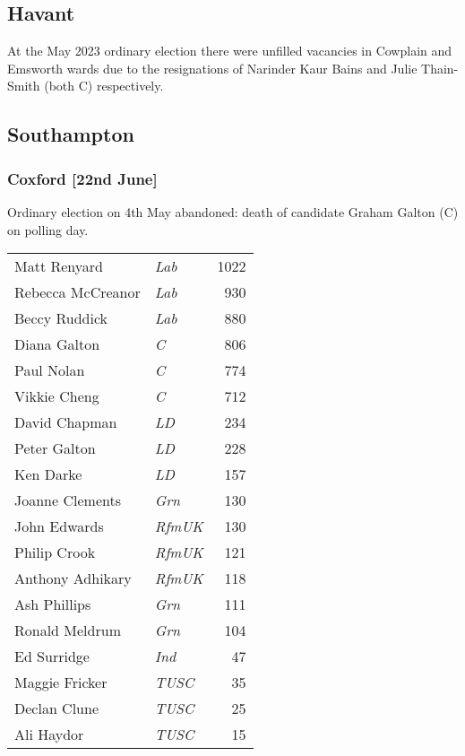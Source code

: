 \documentclass[a4paper,openany]{book}
\begin{document}
\begin{resultsiii}
\subsection*{Havant}

At the May 2023 ordinary election there were unfilled vacancies in Cowplain and Emsworth wards due to the resignations of Narinder Kaur Bains and Julie Thain-Smith (both C) respectively.%
%
%

\subsection*{Southampton}

\subsubsection*{Coxford \hspace*{\fill}\nolinebreak[1]%
	\enspace\hspace*{\fill}
	[22nd June]}


Ordinary election on 4th May abandoned: death of candidate Graham Galton (C) on polling day.

\noindent
\begin{tabular*}{\columnwidth}{@{\extracolsep{\fill}} p{} >{\itshape}l r @{\extracolsep{\fill}}}
	Matt Renyard & Lab & 1022\\
	Rebecca McCreanor & Lab & 930\\
	Beccy Ruddick & Lab & 880\\
	Diana Galton & C & 806\\
	Paul Nolan & C & 774\\
	Vikkie Cheng & C & 712\\
	David Chapman & LD & 234\\
	Peter Galton & LD & 228\\
	Ken Darke & LD & 157\\
	Joanne Clements & Grn & 130\\
	John Edwards & RfmUK & 130\\
	Philip Crook & RfmUK & 121\\
	Anthony Adhikary & RfmUK & 118\\
	Ash Phillips & Grn & 111\\
	Ronald Meldrum & Grn & 104\\
	Ed Surridge & Ind & 47\\
	Maggie Fricker & TUSC & 35\\
	Declan Clune & TUSC & 25\\
	Ali Haydor & TUSC & 15\\
\end{tabular*}


\end{resultsiii}
\end{document}
